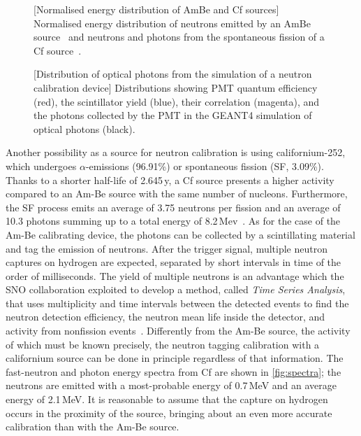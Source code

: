\begin{figure}
	\begin{minipage}[t]{0.49\textwidth}
		\centering
		\resizebox{\textwidth}{!}{}
		[Normalised energy distribution of AmBe and Cf sources]%
		{Normalised energy distribution of neutrons emitted by an AmBe source~\cite{PMID:4744412} %
		and neutrons and photons from the spontaneous fission of a %
		Cf source~\cite{PhysRev.104.699, PhysRev.108.411}.}
		\label{fig:spectra}
	\end{minipage}
	\hfill
	\begin{minipage}[t]{0.49\textwidth}
		\centering
		\resizebox{\textwidth}{!}{}
		[Distribution of optical photons from the simulation of a neutron calibration device]{%
		Distributions showing PMT quantum efficiency (red), the scintillator yield (blue), %
		their correlation (magenta), and the photons collected by the PMT in the GEANT4 %
		simulation of optical photons (black).}
		\label{fig:QE}
	\end{minipage}
\end{figure}

Another possibility as a source for neutron calibration is using californium-252, which %
undergoes $\alpha$-emissions (96.91\%) or spontaneous fission (SF, 3.09\%).
Thanks to a shorter half-life of 2.645\,y, a Cf source presents a higher activity compared to an Am-Be source %
with the same number of nucleons.
Furthermore, the SF process emits an average of 3.75 neutrons per fission and an average of 10.3 photons %
summing up to a total energy of 8.2\,Mev~\cite{PhysRev.104.699}.
As for the case of the Am-Be calibrating device, the photons can be collected by a scintillating material %
and tag the emission of neutrons.
After the trigger signal, multiple neutron captures on hydrogen are expected, separated by short intervals in time %
of the order of milliseconds.
The yield of multiple neutrons is an advantage which the SNO collaboration exploited to develop a method, %
called \emph{Time Series Analysis}, that uses multiplicity and time intervals between the detected events %
to find the neutron detection efficiency, the neutron mean life inside the detector, %
and activity from nonfission events~\cite{Labranche:2004sya}.
Differently from the Am-Be source, the activity of which must be known precisely, the neutron tagging calibration %
with a californium source can be done in principle regardless of that information.
The fast-neutron and photon energy spectra from Cf are shown in \ref{fig:spectra}; %
the neutrons are emitted with a most-probable energy of 0.7\,MeV and an average energy of 2.1\,MeV.
It is reasonable to assume that the capture on hydrogen occurs in the proximity of the source, %
bringing about an even more accurate calibration than with the Am-Be source.


